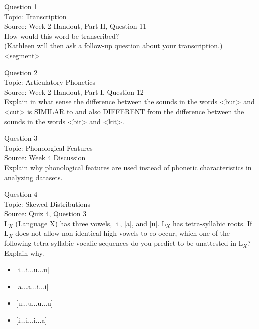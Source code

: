 \documentclass[12pt]{article}
\begin{document}
{\large Question 1}\\

Topic: Transcription\\
Source: Week 2 Handout, Part II, Question 11\\

How would this word be transcribed?\\ (Kathleen will then ask a follow-up question about your transcription.)\\

<segment>


\newpage

{\large Question 2}\\

Topic: Articulatory Phonetics\\
Source: Week 2 Handout, Part I, Question 12\\

Explain in what sense the difference between the sounds in the words <but> and <cut> is SIMILAR to and also DIFFERENT from the difference between the sounds in the words <bit> and <kit>.\\


\newpage

{\large Question 3}\\

Topic: Phonological Features\\
Source: Week 4 Discussion\\

Explain why phonological features are used instead of phonetic characteristics in analyzing datasets.\\


\newpage

{\large Question 4}\\

Topic: Skewed Distributions\\
Source: Quiz 4, Question 3\\

L$_X$ (Language X) has three vowels, [i], [a], and [u]. L$_X$ has tetra-syllabic roots. If L$_X$ does not allow non-identical high vowels to co-occur, which one of the following tetra-syllabic vocalic sequences do you predict to be unattested in L$_X$? Explain why.\\

\begin{itemize} \item {[i...i...u...u]} \item {[a...a...i...i]} \item {[u...u...u...u]} \item {[i...i...i...a]} \end{itemize}
\end{document}
